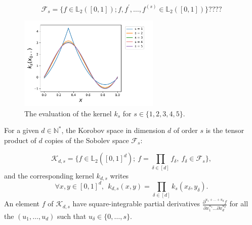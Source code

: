 \documentclass[twoside,11pt]{book}
\numberwithin{theorem}{chapter}
\numberwithin{definition}{chapter}
\numberwithin{proposition}{chapter}
\numberwithin{corollary}{chapter}
\numberwithin{example}{chapter}
\numberwithin{lemma}{chapter}
\begin{document}
\begin{equation}
\mathcal{F}_{s} = \{f \in \mathbb{L}_{2}([0,1]); f,f^{'}, \dots, f^{(s)} \in \mathbb{L}_{2}([0,1]) \}????
\end{equation}
\begin{figure}[]
    \centering
\includegraphics[width= 0.6\textwidth]{img/Sobolev/Bernoulli_kernels_same_node_s_1_5.pdf}
\caption{The evaluation of the kernel $k_{s}$ for $s \in \{1,2,3,4,5\}$.
\label{fig:periodic_sobolev_kernel}}
\end{figure}
For a given $d \in \mathbb{N}^{*}$, the Korobov space in dimension $d$ of order $s$  is the tensor product of $d$ copies of the Sobolev space $\mathcal{F}_{s}$:

\begin{equation}
\mathcal{K}_{d,s} = \{ f \in \mathbb{L}_{2}([0,1]^{d}); \: f = \prod\limits_{\delta \in [d]} f_{\delta}, \: f_{\delta} \in \mathcal{F}_{s} \},
\end{equation}
and the corresponding kernel $k_{d,s}$ writes
\begin{equation}
\forall x,y \in [0,1]^{d}, \:\: k_{d,s}(x,y) = \prod\limits_{\delta \in [d]}k_{s}(x_{\delta},y_{\delta}).
\end{equation}
An element $f$ of $\mathcal{K}_{d,s}$ have square-integrable partial derivatives $\displaystyle \frac{\partial^{u_{1}+ \dots + u_{d}}f}{\partial x_{1}^{u_{1}} \dots \partial x_{d}^{u_{d}}} $ for all the $(u_{1}, \dots,u_{d})$ such that $u_{\delta} \in \{0, \dots, s\}$.
\end{document}
